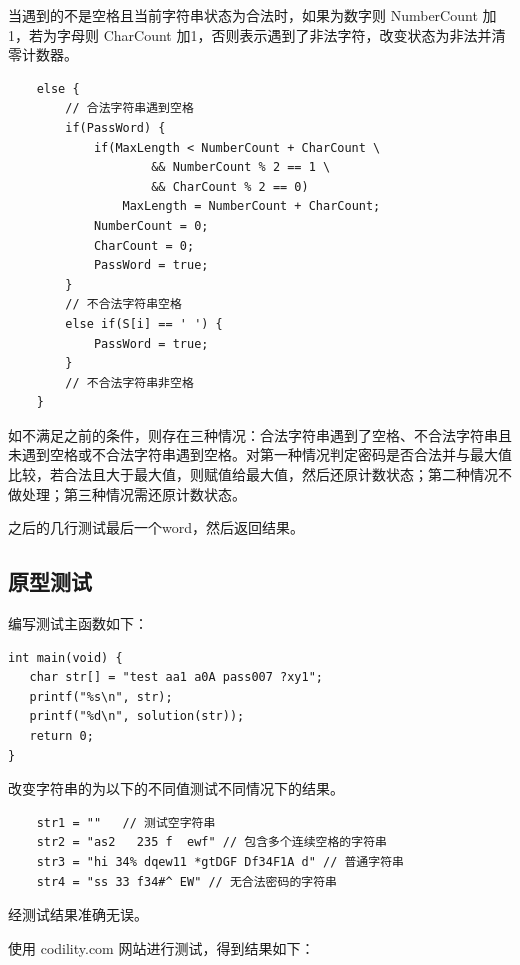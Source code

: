 \begin{spacing}{1.5}
    当遇到的不是空格且当前字符串状态为合法时，如果为数字则 NumberCount 加1，若为字母则 CharCount 加1，否则表示遇到了非法字符，改变状态为非法并清零计数器。

\begin{lstlisting}
    else {
        // 合法字符串遇到空格
        if(PassWord) {
            if(MaxLength < NumberCount + CharCount \
                    && NumberCount % 2 == 1 \
                    && CharCount % 2 == 0)
                MaxLength = NumberCount + CharCount;
            NumberCount = 0;
            CharCount = 0;
            PassWord = true;
        }
        // 不合法字符串空格
        else if(S[i] == ' ') {
            PassWord = true;
        }
        // 不合法字符串非空格
    }
\end{lstlisting}

    如不满足之前的条件，则存在三种情况：合法字符串遇到了空格、不合法字符串且未遇到空格或不合法字符串遇到空格。对第一种情况判定密码是否合法并与最大值比较，若合法且大于最大值，则赋值给最大值，然后还原计数状态；第二种情况不做处理；第三种情况需还原计数状态。

    之后的几行测试最后一个word，然后返回结果。

    \subsection{原型测试}
    编写测试主函数如下：
\begin{lstlisting}
int main(void) {
   char str[] = "test aa1 a0A pass007 ?xy1";
   printf("%s\n", str);
   printf("%d\n", solution(str));
   return 0;
}
\end{lstlisting}

    改变字符串的为以下的不同值测试不同情况下的结果。

\begin{lstlisting}
    str1 = ""   // 测试空字符串
    str2 = "as2   235 f  ewf" // 包含多个连续空格的字符串
    str3 = "hi 34% dqew11 *gtDGF Df34F1A d" // 普通字符串
    str4 = "ss 33 f34#^ EW" // 无合法密码的字符串
\end{lstlisting}

    经测试结果准确无误。

    使用 codility.com 网站进行测试，得到结果如下：


\end{spacing}
